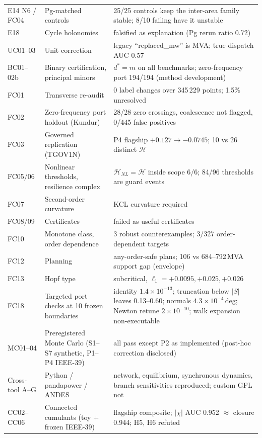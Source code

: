 \documentclass[10pt,a4paper]{article}
\theoremstyle{definition}
\newcommand{\Hy}{\mathcal{H}}
\begin{document}
\begin{longtable}{@{}L{2.1cm}L{7.2cm}L{6.9cm}@{}}
E14 N6 / FC04 & Pg-matched controls & 25/25 controls keep the inter-area family stable; 8/10 failing have it unstable\\
E18 & Cycle holonomies & falsified as explanation (Pg rerun ratio 0.72)\\
UC01--03 & Unit correction & legacy ``replaced\_mw'' is MVA; true-dispatch AUC 0.57\\
BC01--02b & Binary certification, principal minors & $d^*=m$ on all benchmarks; zero-frequency port 194/194 (method development)\\
FC01 & Transverse re-audit & 0 label changes over 345\,229 points; 1.5\% unresolved\\
FC02 & Zero-frequency port holdout (Kundur) & 28/28 zero crossings, coalescence not flagged, 0/445 false positives\\
FC03 & Governed replication (TGOV1N) & P4 flagship $+0.127\to-0.0745$; 10 vs 26 distinct $\Hy$\\
FC05/06 & Nonlinear thresholds, resilience complex & $\Hy_{NL}=\Hy$ inside scope 6/6; 84/96 thresholds are guard events\\
FC07 & Second-order curvature & KCL curvature required\\
FC08/09 & Certificates & failed as useful certificates\\
FC10 & Monotone class, order dependence & 3 robust counterexamples; 3/327 order-dependent targets\\
FC12 & Planning & any-order-safe plans; 106 vs 684--792\,MVA support gap (envelope)\\
FC13 & Hopf type & subcritical, $\ell_1=+0.0095,+0.025,+0.026$\\
FC18 & Targeted port checks at 10 frozen boundaries & identity $1.4\times10^{-13}$; truncation below $|S|$ leaves 0.13--0.60; normals $4.3\times10^{-4}$\,deg; Newton retune $2\times10^{-10}$; walk expansion non-executable\\
MC01--04 & Preregistered Monte Carlo (S1--S7 synthetic, P1--P4 IEEE-39) & all pass except P2 as implemented (post-hoc correction disclosed)\\
Cross-tool A--G & Python / pandapower / ANDES & network, equilibrium, synchronous dynamics, branch sensitivities reproduced; custom GFL not\\
CC02--CC06 & Connected cumulants (toy + frozen IEEE-39) & flagship composite; $|\chi|$ AUC 0.952 $\approx$ closure 0.944; H5, H6 refuted\\
\bottomrule
\end{longtable}
\normalsize
\end{document}
